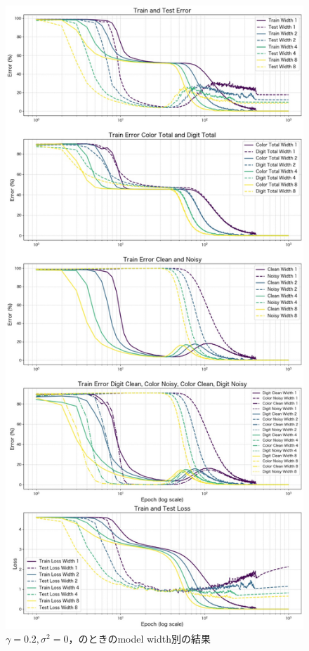 \begin{figure}[H]
    \centering
    \includegraphics[width=0.5\linewidth]{fig/modelwidth_ln0.2.pdf}
    \caption{$\gamma = 0.2, \sigma^2 = 0$，のときのmodel width別の結果}
    \label{fig:modelwidth_ln02}
\end{figure}

\newpage

